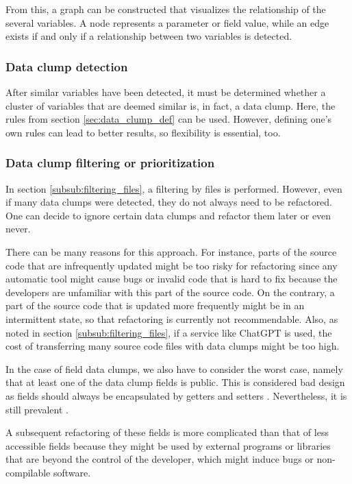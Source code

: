 From this, a graph can be constructed that visualizes the relationship of the several variables. A node represents a parameter or field value, while an edge exists if and only if a relationship between two variables is detected. 

\subsubsection{Data clump detection}
After similar variables have been detected, it must be determined whether a cluster of variables that are deemed similar is, in fact, a data clump. Here, the rules from section \ref{sec:data_clump_def} can be used. However, defining one's own rules can lead to better results, so flexibility is essential, too. 

\subsubsection{Data clump filtering or prioritization} \label{subsub:filtering_data_clumps}
In section \ref{subsub:filtering_files}, a filtering by files is performed. However, even if many data clumps were detected, they do not always need to be refactored. One can decide to ignore certain data clumps and refactor them later or even never. 

There can be many reasons for this approach. For instance, parts of the source code that are infrequently updated might be too risky for refactoring since any automatic tool might cause bugs or invalid code that is hard to fix because the developers are unfamiliar with this part of the source code. On the contrary, a part of the source code that is updated more frequently might be in an intermittent state, so that refactoring is currently not recommendable. Also, as noted in section  \ref{subsub:filtering_files}, if a service like ChatGPT is used, the cost of transferring many source code files with data clumps might be too high. 

In the case of field data clumps, we also have to consider the worst case, namely that at least one of the data clump fields is public. This is considered bad design as fields should always be encapsulated by getters and setters \cite{5680918}. Nevertheless, it is still prevalent \cite{5076631}.

A subsequent refactoring of these fields is more complicated than that of less accessible fields because they might be used by external programs or libraries that are beyond the control of the developer, which might induce bugs or non-compilable software. 

